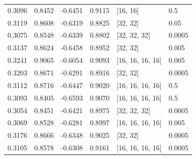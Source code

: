 \begin{tabular}{llllll}
0.3096 & 0.8452 & -0.6451 & 0.9115 & [16, 16] & 0.5 \\
0.3119 & 0.8608 & -0.6319 & 0.8825 & [32, 32] & 0.05 \\
0.3075 & 0.8548 & -0.6339 & 0.8802 & [32, 32, 32] & 0.0005 \\
0.3137 & 0.8624 & -0.6458 & 0.8952 & [32, 32] & 0.005 \\
0.3241 & 0.9065 & -0.6054 & 0.9093 & [16, 16, 16, 16] & 0.005 \\
0.3203 & 0.8671 & -0.6291 & 0.8916 & [32, 32] & 0.0005 \\
0.3112 & 0.8716 & -0.6447 & 0.9020 & [16, 16, 16, 16] & 0.5 \\
0.3093 & 0.8405 & -0.6593 & 0.9070 & [16, 16, 16, 16] & 0.5 \\
0.3054 & 0.8451 & -0.6421 & 0.8975 & [32, 32, 32] & 0.0005 \\
0.3069 & 0.8528 & -0.6281 & 0.8997 & [16, 16, 16, 16] & 0.005 \\
0.3176 & 0.8666 & -0.6348 & 0.9025 & [32, 32] & 0.0005 \\
0.3105 & 0.8578 & -0.6308 & 0.9161 & [16, 16, 16, 16] & 0.0005 \\
\bottomrule
\end{tabular}
